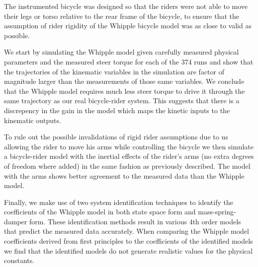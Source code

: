 \documentclass{article}
\begin{document}
The instrumented bicycle was designed so that the riders were not able to move
their legs or torso relative to the rear frame of the bicycle, to ensure that
the assumption of rider rigidity of the Whipple bicycle model was as close to
valid as possible.

We start by simulating the Whipple model given carefully measured physical
parameters and the measured steer torque for each of the 374 runs and show that
the trajectories of the kinematic variables in the simulation are factor of
magnitude larger than the measurements of those same variables. We conclude
that the Whipple model requires much less steer torque to drive it through the
same trajectory as our real bicycle-rider system. This suggests that there is a
discrepency in the gain in the model which maps the kinetic inputs to the
kinematic outputs.

To rule out the possible invalidations of rigid rider assumptions due to us
allowing the rider to move his arms while controlling the bicycle we then
simulate a bicycle-rider model with the inertial effects of the rider's arms
(no extra degrees of freedom where added) in the same fashion as previously
described. The model with the arms shows better agreement to the measured data
than the Whipple model.

Finally, we make use of two system identification techniques to identify the
coefficients of the Whipple model in both state space form and
mass-spring-damper form. These identification methods result in various 4th
order models that predict the measured data accurately. When comparing the
Whipple model coefficients derived from first principles to the coefficients of
the identified models we find that the identified models do not generate
realistic values for the physical constants.
\end{document}
